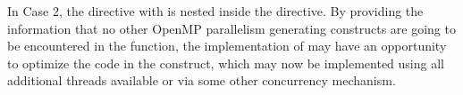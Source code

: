 In Case 2, the  directive with  is nested inside the  directive. By providing the information 
that no other OpenMP parallelism generating constructs are going to be encountered in the function, 
the implementation of  may have an opportunity to optimize the code in the  construct, 
which may now be implemented using all additional threads available or via some other concurrency mechanism.

